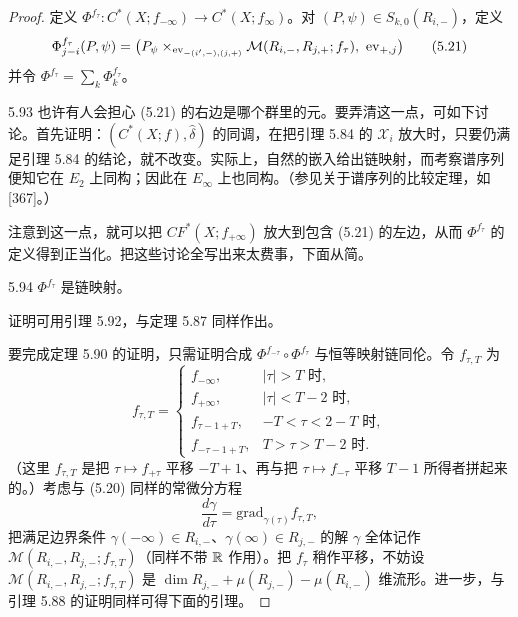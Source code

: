\begin{proof}
定义 $\Phi^{f_\tau}\colon C^*(X;f_{-\infty})\to C^*(X;f_\infty)$。对 $(P,\psi)\in S_{k,0}(R_{i,-})$，定义
\begin{equation}
  \Phi^{f_\tau}_{j-i}(P,\psi)=\bigl(P_\psi\times_{\ev_{-(i',-),(j,+)}}\mathcal{M}(R_{i,-},R_{j,+};f_\tau),\ \ev_{+,j}\bigr) \tag{5.21}
\end{equation}
并令 $\Phi^{f_\tau}=\sum_k\Phi^{f_\tau}_k$。

\begin{remark}{5.93}
  也许有人会担心 (5.21) 的右边是哪个群里的元。要弄清这一点，可如下讨论。首先证明：$(C^*(X;f),\hat\delta)$ 的同调，在把引理 5.84 的 $\mathcal{X}_i$ 放大时，只要仍满足引理 5.84 的结论，就不改变。实际上，自然的嵌入给出链映射，而考察谱序列便知它在 $E_2$ 上同构；因此在 $E_\infty$ 上也同构。（参见关于谱序列的比较定理，如 [367]。）

  注意到这一点，就可以把 $CF^*(X;f_{+\infty})$ 放大到包含 (5.21) 的左边，从而 $\Phi^{f_\tau}$ 的定义得到正当化。把这些讨论全写出来太费事，下面从简。
\end{remark}

\begin{lemma}{5.94}
  $\Phi^{f_\tau}$ 是链映射。
\end{lemma}

证明可用引理 5.92，与定理 5.87 同样作出。

要完成定理 5.90 的证明，只需证明合成 $\Phi^{f_{-\tau}}\circ\Phi^{f_\tau}$ 与恒等映射链同伦。令 $f_{\tau,T}$ 为
\[
f_{\tau,T}=
\begin{cases}
  f_{-\infty}, & |\tau|>T\text{ 时},\\
  f_{+\infty}, & |\tau|<T-2\text{ 时},\\
  f_{\tau-1+T}, & -T<\tau<2-T\text{ 时},\\
  f_{-\tau-1+T}, & T>\tau>T-2\text{ 时}.
\end{cases}
\]
（这里 $f_{\tau,T}$ 是把 $\tau\mapsto f_{+\tau}$ 平移 $-T+1$、再与把 $\tau\mapsto f_{-\tau}$ 平移 $T-1$ 所得者拼起来的。）考虑与 (5.20) 同样的常微分方程
\[
\frac{d\gamma}{d\tau}=\mathrm{grad}_{\gamma(\tau)}f_{\tau,T},
\]
把满足边界条件 $\gamma(-\infty)\in R_{i,-}$、$\gamma(\infty)\in R_{j,-}$ 的解 $\gamma$ 全体记作 $\mathcal{M}(R_{i,-},R_{j,-};f_{\tau,T})$（同样不带 $\mathbb{R}$ 作用）。把 $f_\tau$ 稍作平移，不妨设 $\mathcal{M}(R_{i,-},R_{j,-};f_{\tau,T})$ 是 $\dim R_{j,-}+\mu(R_{j,-})-\mu(R_{i,-})$ 维流形。进一步，与引理 5.88 的证明同样可得下面的引理。


\end{proof}
